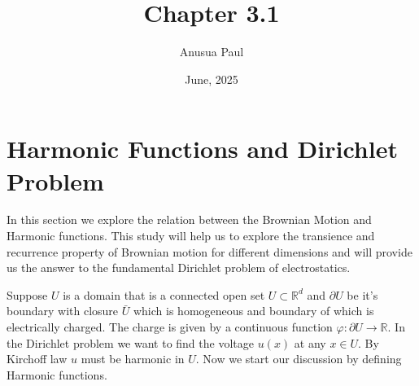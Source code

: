 \documentclass{article}
\title{Chapter 3.1}
\author{Anusua Paul}
\date{June, 2025}
\numberwithin{equation}{section}
\begin{document}
\maketitle

\section{Harmonic Functions and Dirichlet Problem }
In this section we explore the relation between the Brownian Motion and Harmonic functions. This study will help us to explore the transience and recurrence property of Brownian motion for different dimensions and will provide us the answer to the fundamental Dirichlet problem of electrostatics. 

\noindent Suppose \(U \) is a domain that is a connected open set \(U \subset \mathbb{R}^d\) and \(\partial{U}\) be it's boundary with closure \(\bar{U}\) which is homogeneous and boundary of which is electrically charged. The charge is given by a continuous function \(\varphi : \partial{U} \to \mathbb{R}\). In the Dirichlet problem we want to find the voltage \(u(x)\) at any \(x \in U\). By Kirchoff law \(u\) must be harmonic in \(U\). Now we start our discussion by defining Harmonic functions.
\end{document}
